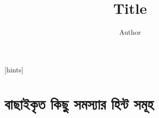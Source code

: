\documentclass[statementpaper, 11pt, twoside, oldfontcommands]{memoir}
\title{\Huge\textbf{Title}}
\author{Author}
\date{}
\begin{document}
\mainmatter

% 
% 
% 

[hints]

\tableofcontents*








\part{বাছাইকৃত কিছু সমস্যার হিন্ট সমূহ}



% 
% 
\end{document}
